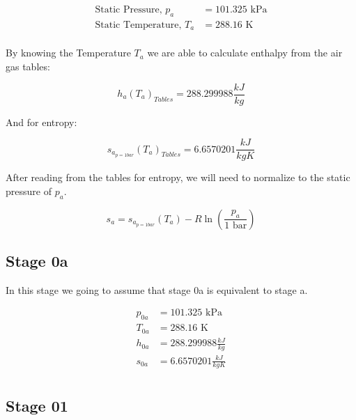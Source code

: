 \documentclass[titlepage]{article}
\begin{document}
    \begin{equation}
        \begin{aligned}
            \text{Static Pressure, $p_{a}$} &= 101.325 \text{ kPa} \\
            \text{Static Temperature, $T_{a}$} &= 288.16 \text{ K} \\
        \end{aligned}
    \end{equation}

    By knowing the Temperature $T_{a}$ we are able to calculate enthalpy from the air gas tables:

    \begin{equation}
        h_{a}(T_{a})_{Tables} = 288.299988 \frac{kJ}{kg}
    \end{equation}

    And for entropy:

    \begin{equation}
        s_{a_{p=1 bar}}(T_{a})_{Tables} = 6.6570201 \frac{kJ}{kg K}
    \end{equation}

    After reading from the tables for entropy, we will need to normalize to the static pressure of $p_{a}$.

    \begin{equation}
        s_{a} = s_{a_{p=1 bar}}(T_{a}) - R \ln \left( \frac{p_{a}}{1 \text{ bar}} \right)
    \end{equation}

    \subsection{Stage 0a}
    In this stage we going to assume that stage 0a is equivalent to stage a. 

    \begin{equation}
        \begin{aligned}
            \text{$p_{0a}$} &= 101.325 \text{ kPa} \\
            \text{$T_{0a}$} &= 288.16 \text{ K} \\
            \text{$h_{0a}$} &= 288.299988 \frac{kJ}{kg} \\
            \text{$s_{0a}$} &= 6.6570201 \frac{kJ}{kg K} \\
        \end{aligned}
    \end{equation}

    \subsection{Stage 01}
\end{document}
